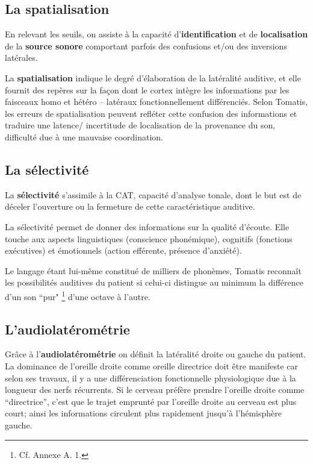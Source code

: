 \subsection{La spatialisation}




En relevant les seuils, on assiste à la capacité
d'\textbf{identification} et de \textbf{localisation} de la
\textbf{source sonore} comportant parfois des confusions et/ou des inversions
latérales.

La \textbf{spatialisation}
indique le degré d'élaboration de la latéralité auditive,
et elle fournit des repères sur la façon dont le cortex intègre les informations
par les faisceaux homo et hétéro -- latéraux fonctionnellement différenciés.
Selon Tomatis, les erreurs de spatialisation peuvent refléter cette confusion des informations et traduire une latence/
incertitude de localisation de la provenance du son, difficulté due à une mauvaise coordination.
\subsection{La sélectivité}


  La \textbf{sélectivité }s'assimile  à  la CAT, capacité d'analyse tonale, \autocite{tomatis:loreille} dont
le but est de déceler l'ouverture ou la fermeture de cette
caractéristique auditive.

La sélectivité permet de donner des informations sur la
qualité d'écoute. Elle touche aux aspects  linguistiques (conscience
phonémique), cognitifs (fonctions exécutives) et émotionnels (action
efférente, présence d'anxiété).


Le langage étant lui-même constitué de milliers de phonèmes, Tomatis reconnaît les possibilités auditives du patient si celui-ci  distingue au minimum la différence d'un son ``pur" \footnote{Cf. Annexe A. 1. } d'une octave à l'autre.


\subsection{ L'audiolatérométrie}

Grâce à l'\textbf{audiolatérométrie} on définit  la latéralité droite ou gauche du patient. La dominance
de l'oreille droite comme oreille directrice doit être manifeste car
selon ses travaux, il y a une différenciation fonctionnelle
physiologique due à la longueur des nerfs récurrents.
Si le cerveau préfère prendre l'oreille droite comme
``directrice'', c'est que le trajet emprunté par l'oreille droite au cerveau est plus
court; ainsi les informations circulent plus rapidement jusqu'à l'hémisphère gauche.

